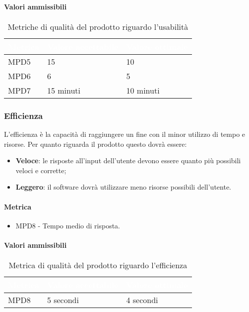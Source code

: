 \paragraph{Valori ammissibili}
\renewcommand{\arraystretch}{1.5}
\begin{longtable}{C{2.5cm} C{4cm} C{4cm}}
\textcolor{white}{\textbf{Metrica}}&
\textcolor{white}{\textbf{Valore accettabile}}&
\textcolor{white}{\textbf{Valore ottimale}}\\	
\endhead
\endfoot
{}\caption{Metriche di qualità del prodotto riguardo l'usabilità}
\endlastfoot
		MPD5 &  
		15 &
		10 \\		
		MPD6 &  
		6 &
		5 \\
		MPD7 &  
		15 minuti &
		10 minuti\\
\end{longtable}
\subsubsection{Efficienza}
L'efficienza è la capacità di raggiungere un fine con il minor utilizzo di tempo e risorse. Per quanto riguarda il prodotto questo dovrà essere:
\begin{itemize}
\item \textbf{Veloce}: le risposte all'input dell'utente devono essere quanto più possibili veloci e corrette;
\item \textbf{Leggero}: il software dovrà utilizzare meno risorse possibili dell'utente.
\end{itemize}
\paragraph{Metrica}
\begin{itemize}
\item MPD8 - Tempo medio di risposta.
\end{itemize}
\paragraph{Valori ammissibili}
\renewcommand{\arraystretch}{1.5}
\begin{longtable}{C{2.5cm} C{4cm} C{4cm}}
\textcolor{white}{\textbf{Metrica}}&
\textcolor{white}{\textbf{Valore accettabile}}&
\textcolor{white}{\textbf{Valore ottimale}}\\	
\endhead
\endfoot
{}\caption{Metrica di qualità del prodotto riguardo l'efficienza}
\endlastfoot
		MPD8 &  
		5 secondi &
		4 secondi \\
\end{longtable}

